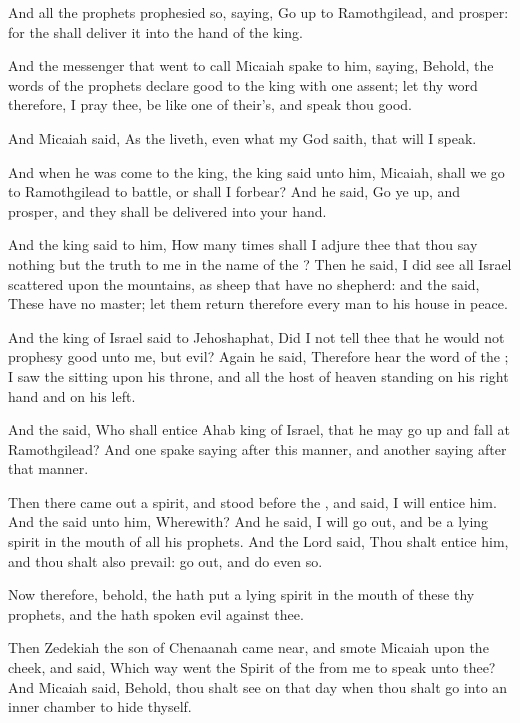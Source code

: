 \verse And all the prophets prophesied so, saying, Go up to Ramothgilead, and prosper: for the \LORD shall deliver it into the hand of the king.

\verse And the messenger that went to call Micaiah spake to him, saying, Behold, the words of the prophets declare good to the king with one assent; let thy word therefore, I pray thee, be like one of their's, and speak thou good.

\verse And Micaiah said, As the \LORD liveth, even what my God saith, that will I speak.

\verse And when he was come to the king, the king said unto him, Micaiah, shall we go to Ramothgilead to battle, or shall I forbear?  And he said, Go ye up, and prosper, and they shall be delivered into your hand.

\verse And the king said to him, How many times shall I adjure thee that thou say nothing but the truth to me in the name of the \LORD?  \verse Then he said, I did see all Israel scattered upon the mountains, as sheep that have no shepherd: and the \LORD said, These have no master; let them return therefore every man to his house in peace.

\verse And the king of Israel said to Jehoshaphat, Did I not tell thee that he would not prophesy good unto me, but evil?  \verse Again he said, Therefore hear the word of the \LORD; I saw the \LORD sitting upon his throne, and all the host of heaven standing on his right hand and on his left.

\verse And the \LORD said, Who shall entice Ahab king of Israel, that he may go up and fall at Ramothgilead? And one spake saying after this manner, and another saying after that manner.

\verse Then there came out a spirit, and stood before the \LORD, and said, I will entice him. And the \LORD said unto him, Wherewith?  \verse And he said, I will go out, and be a lying spirit in the mouth of all his prophets. And the Lord said, Thou shalt entice him, and thou shalt also prevail: go out, and do even so.

\verse Now therefore, behold, the \LORD hath put a lying spirit in the mouth of these thy prophets, and the \LORD hath spoken evil against thee.

\verse Then Zedekiah the son of Chenaanah came near, and smote Micaiah upon the cheek, and said, Which way went the Spirit of the \LORD from me to speak unto thee?  \verse And Micaiah said, Behold, thou shalt see on that day when thou shalt go into an inner chamber to hide thyself.

